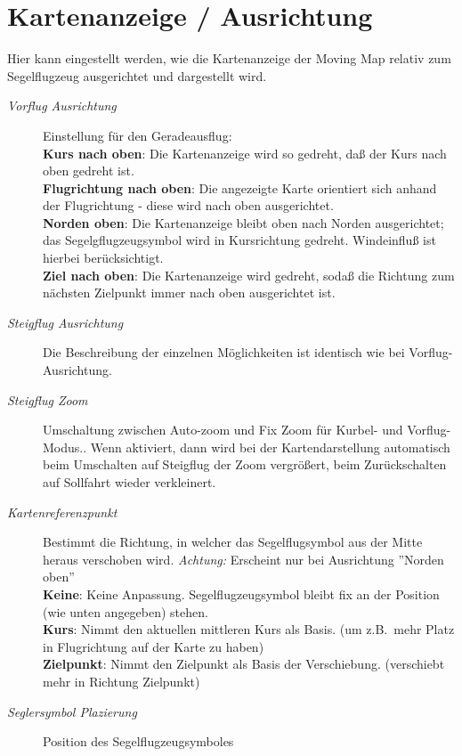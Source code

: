 \section{Kartenanzeige / Ausrichtung}\label{sec:map-projection}
Hier kann eingestellt werden, wie die Kartenanzeige der Moving Map relativ zum Segelflugzeug
ausgerichtet und dargestellt wird.
\begin{description}
\item[\textit{Vorflug Ausrichtung}]  \label{conf:orientation} Einstellung für den Geradeausflug: \\
  {\bf Kurs nach oben}:   Die Kartenanzeige wird so gedreht, daß der Kurs nach oben gedreht ist.\\
  {\bf Flugrichtung nach oben}:   Die angezeigte Karte orientiert sich anhand der Flugrichtung - diese wird nach oben ausgerichtet.\\
  {\bf Norden oben}:   Die Kartenanzeige bleibt oben nach Norden ausgerichtet; das
  Segelgflugzeugsymbol  wird in Kursrichtung gedreht. Windeinfluß ist hierbei berücksichtigt. \\
  {\bf Ziel nach oben}:   Die Kartenanzeige wird gedreht, sodaß die Richtung zum nächsten   Zielpunkt immer nach oben ausgerichtet ist.
\item[\textit{Steigflug Ausrichtung}] Die Beschreibung der einzelnen Möglichkeiten ist identisch wie bei Vorflug-Ausrichtung.
\item[\textit{Steigflug Zoom}]  \label{conf:circlingzoom}
Umschaltung zwischen Auto-zoom und Fix Zoom für Kurbel- und Vorflug-Modus..
  Wenn aktiviert, dann wird bei der Kartendarstellung automatisch beim Umschalten auf Steigflug der Zoom vergrößert,
  beim Zurückschalten auf Sollfahrt wieder verkleinert.
\item[\textit{Kartenreferenzpunkt}] Bestimmt die Richtung, in welcher das Segelflugsymbol
aus der Mitte heraus verschoben wird. \textsl{Achtung:} \achtung Erscheint nur bei Ausrichtung ''Norden oben''\\
  {\bf Keine}: Keine Anpassung. Segelflugzeugsymbol bleibt fix an der Position (wie unten angegeben)  stehen.\\
  {\bf Kurs}: Nimmt den aktuellen mittleren Kurs als Basis. (um z.B.\ mehr Platz in Flugrichtung auf der Karte zu haben) \\
  {\bf Zielpunkt}: Nimmt den Zielpunkt als Basis der Verschiebung. (verschiebt mehr in Richtung Zielpunkt)
\item[\textit{Seglersymbol Plazierung}]  \label{conf:gliderposition} Position des Segelflugzeugsymboles

\end{description}
